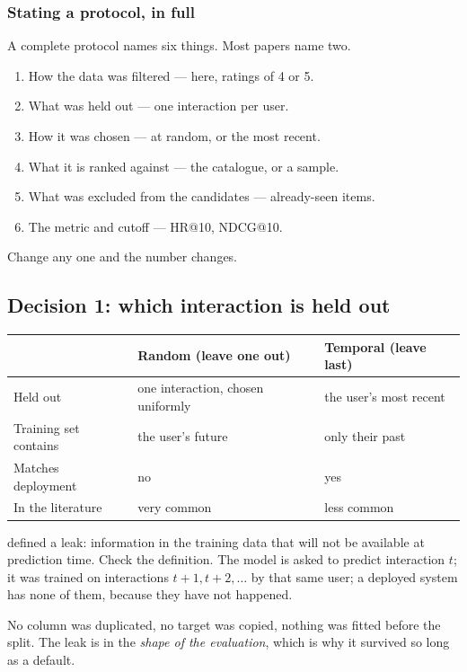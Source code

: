 \documentclass[11pt,a4paper]{article}
\begin{document}
\subsubsection{Stating a protocol, in full}

A complete protocol names six things. Most papers name two.

\begin{enumerate}[leftmargin=*,nosep]
  \item How the data was filtered --- here, ratings of 4 or 5.
  \item What was held out --- one interaction per user.
  \item How it was chosen --- at random, or the most recent.
  \item What it is ranked against --- the catalogue, or a sample.
  \item What was excluded from the candidates --- already-seen items.
  \item The metric and cutoff --- HR@10, NDCG@10.
\end{enumerate}

Change any one and the number changes.

\subsection{Decision 1: which interaction is held out}

\begin{center}
\small
\begin{tabular}{p{}p{}p{}}
\toprule
 & \textbf{Random (leave one out)} & \textbf{Temporal (leave last)} \\
\midrule
Held out       & one interaction, chosen uniformly & the user's most recent \\
Training set contains & the user's future & only their past \\
Matches deployment & no & yes \\
In the literature & very common & less common \\
\bottomrule
\end{tabular}
\end{center}

\begin{failbox}[title={Failure condition --- the random split is a leak, and it looks like a convention}]
 defined a leak: information in the training data that will not be
available at prediction time. Check the definition. The model is asked to
predict interaction $t$; it was trained on interactions $t{+}1, t{+}2, \ldots$
by that same user; a deployed system has none of them, because they have not
happened.

No column was duplicated, no target was copied, nothing was fitted before the
split. The leak is in the \emph{shape of the evaluation}, which is why it
survived so long as a default.
\end{failbox}
\end{document}
